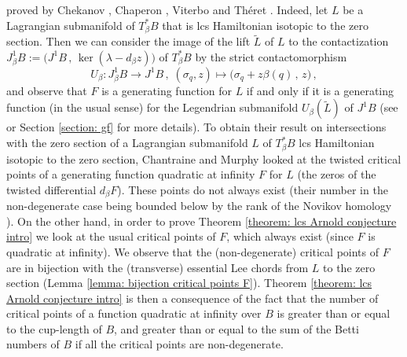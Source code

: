 \documentclass{amsart}
\theoremstyle{remark}
\begin{document}
proved by Chekanov \cite{Chekanov}, Chaperon \cite{Chaperon},
Viterbo \cite{Viterbo} and Th\'eret \cite{Theret, Theret_thesis}.
Indeed,
let $L$ be a Lagrangian submanifold of $T_{\beta}^{\ast}B$
that is lcs Hamiltonian isotopic to the zero section.
Then we can consider the image
of the lift $\widetilde{L}$ of $L$ to the contactization
$J^1_{\beta}B := \big( J^1B \,,\, \ker (\lambda - d_{\beta}z) \big)$
of $T^{\ast}_{\beta}B$
by the strict contactomorphism
$$
U_{\beta}: J^1_{\beta}B \to J^1B \,,\;
(\sigma_q, z) \mapsto \big( \sigma_q + z \beta(q) \,,\, z \big) \,,
$$
and observe that $F$ is a generating function for $L$
if and only if it is a generating function
(in the usual sense) for the Legendrian submanifold
$U_{\beta} (\widetilde{L})$ of $J^1B$
(see \cite{CM} or Section \ref{section: gf}
for more details).
To obtain their result on intersections with the zero section
of a Lagrangian submanifold $L$ of $T_{\beta}^{\ast}B$
lcs Hamiltonian isotopic to the zero section,
Chantraine and Murphy looked at the twisted critical points
of a generating function quadratic at infinity $F$ for $L$
(the zeros of the twisted differential $d_{\beta}F$).
These points do not always exist
(their number in the non-degenerate case
being bounded below by the rank of the Novikov homology \cite{CM, Currier 2}).
On the other hand,
in order to prove Theorem \ref{theorem: lcs Arnold conjecture intro}
we look at the usual critical points of $F$,
which always exist
(since $F$ is quadratic at infinity).
We observe that the (non-degenerate) critical points of $F$
are in bijection with the (transverse) essential Lee chords
from $L$ to the zero section
(Lemma \ref{lemma: bijection critical points F}).
Theorem \ref{theorem: lcs Arnold conjecture intro}
is then a consequence of the fact that
the number of critical points of a function quadratic at infinity over $B$
is greater than or equal to the cup-length of $B$,
and greater than or equal to the sum of the Betti numbers of $B$
if all the critical points are non-degenerate.
\end{document}
